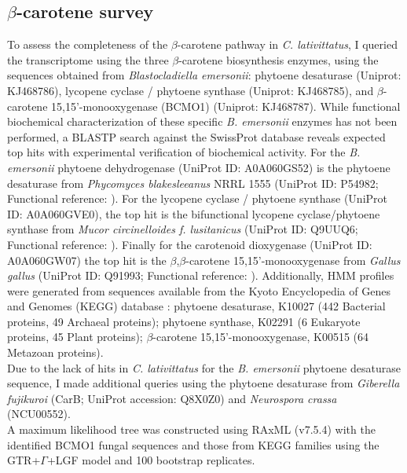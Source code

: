 \subsection*{$\beta$-carotene survey}
To assess the completeness of the $\beta$-carotene pathway in \textit{C. lativittatus}, I queried the transcriptome using the three $\beta$-carotene biosynthesis enzymes, using the sequences obtained from \textit{Blastocladiella emersonii}: phytoene desaturase (Uniprot: KJ468786), lycopene cyclase / phytoene synthase (Uniprot: KJ468785), and $\beta$-carotene 15,15'-monooxygenase (BCMO1) (Uniprot: KJ468787). While functional biochemical characterization of these specific \textit{B. emersonii} enzymes has not been performed, a BLASTP search against the SwissProt database reveals expected top hits with experimental verification of biochemical activity. For the \textit{B. emersonii} phytoene dehydrogenase (UniProt ID: A0A060GS52) is the phytoene desaturase from \textit{Phycomyces blakesleeanus} NRRL 1555 (UniProt ID: P54982; Functional reference: \cite{RuizHidalgo1997}). For the lycopene cyclase / phytoene synthase (UniProt ID: A0A060GVE0), the top hit is the bifunctional lycopene cyclase/phytoene synthase from \textit{Mucor circinelloides f. lusitanicus} (UniProt ID: Q9UUQ6; Functional reference: \cite{Velayos2000}). Finally for the carotenoid dioxygenase (UniProt ID: A0A060GW07) the top hit is the $\beta$,$\beta$-carotene 15,15'-monooxygenase from \textit{Gallus gallus} (UniProt ID: Q91993; Functional reference: \cite{Wyss2000}). Additionally, HMM profiles were generated from sequences available from the Kyoto Encyclopedia of Genes and Genomes (KEGG) database \cite{Kanehisa2000,Kanehisa2014}: phytoene desaturase, K10027 (442 Bacterial proteins, 49 Archaeal proteins); phytoene synthase, K02291 (6 Eukaryote proteins, 45 Plant proteins); $\beta$-carotene 15,15'-monooxygenase, K00515 (64 Metazoan proteins).\\
\indent Due to the lack of hits in \textit{C. lativittatus} for the \textit{B. emersonii} phytoene desaturase sequence, I made additional queries using the phytoene desaturase from \textit{Giberella fujikuroi} (CarB; UniProt accession: Q8X0Z0) and \textit{Neurospora crassa} (NCU00552).\\
\indent A maximum likelihood tree was constructed using RAxML (v7.5.4) with the identified BCMO1 fungal sequences and those from KEGG families using the GTR+$\Gamma$+LGF model and 100 bootstrap replicates. \\

